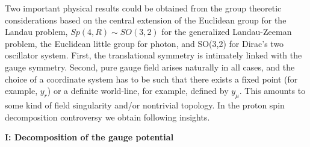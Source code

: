 \documentclass[aps, singlecolumn, showpacs]{revtex4-2}
\begin{document}
Two important physical results could be obtained from the group theoretic considerations based on the central extension of the Euclidean group for the Landau problem, $Sp(4,R) \sim SO(3,2)$ for the generalized Landau-Zeeman problem, the Euclidean little group for photon, and SO(3,2) for Dirac's two oscillator system. First, the translational symmetry is intimately linked with the gauge symmetry. Second, pure gauge field arises naturally in all cases, and the choice of a coordinate system has to be such that there exists a fixed point (for example, $y_r$) or a definite world-line, for example, defined by $y_\mu$. This amounts to some kind of field singularity and/or nontrivial topology. In the proton spin decomposition controversy we obtain following insights.

{\bf I: Decomposition of the gauge potential}
\end{document}
